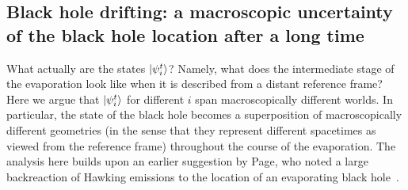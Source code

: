 \documentclass[12pt]{article}
\begin{document}
\subsection{Black hole drifting: a macroscopic uncertainty of the black 
 hole location after a long time}
\label{subsec:drifting}

What actually are the states $\left| \psi^t_i \right>$?  Namely, what does the 
intermediate stage of the evaporation look like when it is described 
from a distant reference frame?  Here we argue that $\left| \psi^t_i \right>$ 
for different $i$ span macroscopically different worlds.  In particular, 
the state of the black hole becomes a superposition of macroscopically 
different geometries (in the sense that they represent different 
spacetimes as viewed from the reference frame) throughout the course 
of the evaporation.  The analysis here builds upon an earlier suggestion 
by Page, who noted a large backreaction of Hawking emissions to the 
location of an evaporating black hole~\cite{Page:1979tc}.
\end{document}
